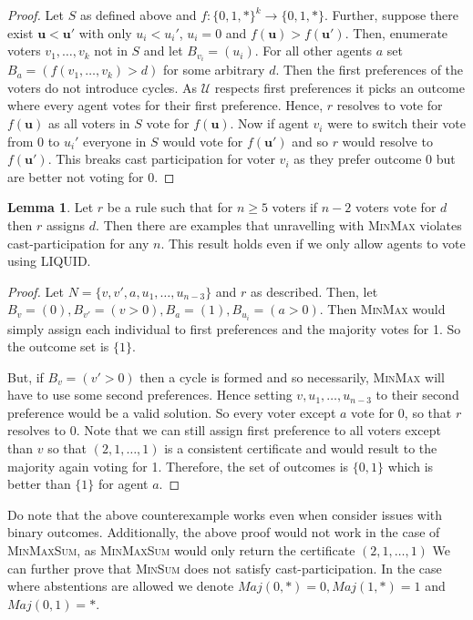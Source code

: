 \documentclass[11pt,a4paper, titlepage]{article}
\theoremstyle{definition}
\newtheorem{lemma}[theorem]{Lemma}
\let\vec\mathbf
\begin{document}
\begin{proof}
    Let $S$ as defined above and $f: \{0, 1, *\}^k \longrightarrow \{0,1, *\}$.
    Further, suppose there exist $\vec{u} < \vec{u}'$ with only $u_i < u_i'$, $u_i = 0$ and $f(\vec{u}) > f(\vec{u}')$. Then, enumerate voters $v_1, \ldots, v_k$ not in $S$ and let $B_{v_i} = (u_i)$. 
    For all other agents $a$ set $B_{a} = (f(v_1, \ldots, v_k) > d)$ for some arbitrary $d$. 
    Then the first preferences of the voters do not introduce cycles. 
    As $\mathcal{U}$ respects first preferences it picks an outcome where every agent votes for their first preference.
    Hence, $r$ resolves to vote for $f(\vec{u})$ as all voters in $S$ vote for $f(\vec{u})$.
    Now if agent $v_i$ were to switch their vote from $0$ to $u_i'$ everyone in $S$ would vote for $f(\vec{u}')$ and so $r$ would resolve to $f(\vec{u}')$. This breaks cast participation for voter $v_i$ as they prefer outcome 0 but are better not voting for 0.
\end{proof}

\begin{lemma}
    Let $r$ be a rule such that for $n \geq 5$ voters if $n-2$ voters vote for $d$ then $r$ assigns $d$. Then there are examples that unravelling with \textsc{MinMax} violates cast-participation for any $n$. This result holds even if we only allow agents to vote using LIQUID.
\end{lemma}

\begin{proof}
    Let $N = \{v, v', a, u_1, \ldots, u_{n-3}\}$ and $r$ as described. Then, let $B_v = (0), B_{v'} = (v > 0), B_a = (1), B_{u_i} = (a > 0)$. Then \textsc{MinMax} would simply assign each individual to first preferences and the majority votes for 1. So the outcome set is $\{1\}$.

    But, if $B_v = (v' > 0)$ then a cycle is formed and so necessarily, \textsc{MinMax} will have to use some second preferences. Hence setting $v, u_1, \ldots, u_{n-3}$ to their second preference would be a valid solution. So every voter except $a$ vote for $0$, so that $r$ resolves to $0$. 
    Note that we can still assign first preference to all voters except than $v$ so that $(2, 1, \ldots, 1)$ is a consistent certificate and would result to the majority again voting for 1. 
    Therefore, the set of outcomes is $\{0, 1\}$ which is better than $\{1\}$ for agent $a$.
\end{proof}

Do note that the above counterexample works even when consider issues with binary outcomes.
Additionally, the above proof would not work in the case of \textsc{MinMaxSum}, as \textsc{MinMaxSum} would only return the certificate $(2, 1, \ldots, 1)$ 
We can further prove that \textsc{MinSum} does not satisfy cast-participation. 
In the case where abstentions are allowed we denote $\mathit{Maj}(0, *) = 0, \mathit{Maj}(1, *) = 1$ and $\mathit{Maj}(0, 1) = *$.
\end{document}
